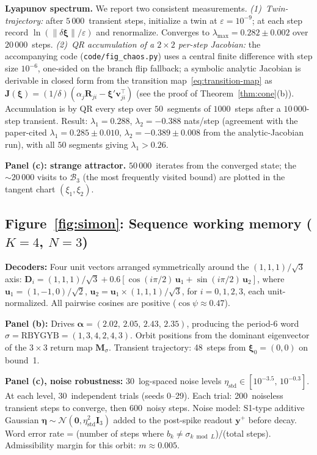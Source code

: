 \documentclass[12pt]{article}
\newcommand{\vv}[1]{\mathbf{#1}}
\newcommand{\DD}{\vv{D}}
\newcommand{\yy}{\vv{y}}
\newcommand{\xxi}{\boldsymbol{\xi}}
\newcommand{\Bsp}{\mathcal{B}}
\begin{document}
\textbf{Lyapunov spectrum.} We report two consistent measurements. \emph{(1)~Twin-trajectory:} after $5\,000$~transient steps, initialize a twin at $\varepsilon=10^{-9}$; at each step record $\ln(\|\delta\xxi\|/\varepsilon)$ and renormalize. Converges to $\lambda_{\max}=0.282\pm 0.002$ over $20\,000$~steps. \emph{(2)~QR accumulation of a $2\times 2$ per-step Jacobian:} the accompanying code (\texttt{code/fig\_chaos.py}) uses a central finite difference with step size $10^{-6}$, one-sided on the branch flip fallback; a symbolic analytic Jacobian is derivable in closed form from the transition map~\eqref{eq:transition-map} as $\vv{J}(\xxi)=(1/\delta)(\alpha_j\vv{R}_{ji}-\xxi'\vv{v}_{ji}^\top)$ (see the proof of Theorem~\ref{thm:cone}(b)). Accumulation is by QR every step over $50$~segments of $1000$~steps after a $10\,000$-step transient. Result: $\lambda_1=0.288$, $\lambda_2=-0.388$ nats/step (agreement with the paper-cited $\lambda_1=0.285\pm 0.010$, $\lambda_2=-0.389\pm 0.008$ from the analytic-Jacobian run), with all $50$ segments giving $\lambda_1>0.26$.

\textbf{Panel (c): strange attractor.} $50\,000$~iterates from the converged state; the ${\sim}20\,000$ visits to $\Bsp_3$ (the most frequently visited bound) are plotted in the tangent chart $(\xi_1,\xi_2)$.

\subsection{Figure~\ref{fig:simon}: Sequence working memory ($K{=}4$, $N{=}3$)}\label{app:fig-simon}

\textbf{Decoders:} Four unit vectors arranged symmetrically around the $(1,1,1)/\sqrt{3}$ axis:
$\DD_i = (1,1,1)/\sqrt{3} + 0.6[\cos(i\pi/2)\,\vv{u}_1+\sin(i\pi/2)\,\vv{u}_2]$,
where $\vv{u}_1=(1,-1,0)/\sqrt{2}$, $\vv{u}_2=\vv{u}_1\times(1,1,1)/\sqrt{3}$, for $i=0,1,2,3$, each unit-normalized. All pairwise cosines are positive ($\cos\psi\approx 0.47$).

\textbf{Panel (b):} Drives $\boldsymbol{\alpha}=(2.02,\,2.05,\,2.43,\,2.35)$, producing the period-6 word $\sigma=\text{RBYGYB}=(1,3,4,2,4,3)$. Orbit positions from the dominant eigenvector of the $3\times 3$ return map $\vv{M}_\sigma$. Transient trajectory: 48~steps from $\xxi_0=(0,0)$ on bound~1.

\textbf{Panel (c), noise robustness:} 30~log-spaced noise levels $\eta_{\text{std}}\in[10^{-3.5},\,10^{-0.3}]$. At each level, 30~independent trials (seeds 0--29). Each trial: 200~noiseless transient steps to converge, then 600~noisy steps. Noise model: S1-type additive Gaussian $\boldsymbol{\eta}\sim\mathcal{N}(\vv{0},\eta_{\text{std}}^2\vv{I}_3)$ added to the post-spike readout $\yy^+$ before decay. Word error rate = (number of steps where $b_k\neq\sigma_{k\bmod L}$)/(total steps). Admissibility margin for this orbit: $m\approx 0.005$.
\end{document}
